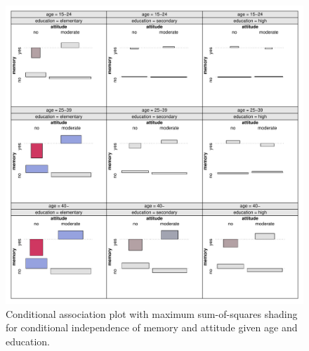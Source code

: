\documentclass{Z}
\begin{document}
\begin{figure}[t!]
\begin{center}
\includegraphics{residual-shadings-Punishment-assoc1}
\caption{Conditional association plot with maximum sum-of-squares shading for conditional
independence of memory and attitude given age and education.}
\label{fig:pun}
\end{center}
\end{figure}
\end{document}

